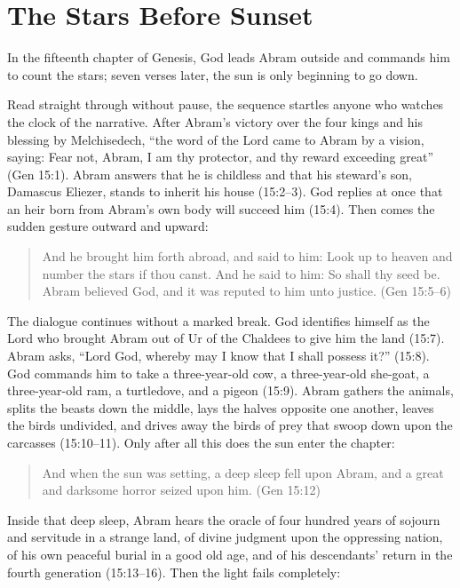 \section{The Stars Before Sunset}

In the fifteenth chapter of Genesis, God leads Abram outside and commands him to count the stars; seven verses later, the sun is only beginning to go down.

Read straight through without pause, the sequence startles anyone who watches the clock of the narrative. After Abram's victory over the four kings and his blessing by Melchisedech, ``the word of the Lord came to Abram by a vision, saying: Fear not, Abram, I am thy protector, and thy reward exceeding great'' (Gen 15:1). Abram answers that he is childless and that his steward's son, Damascus Eliezer, stands to inherit his house (15:2--3). God replies at once that an heir born from Abram's own body will succeed him (15:4). Then comes the sudden gesture outward and upward:

\begin{quote}
And he brought him forth abroad, and said to him: Look up to heaven and number the stars if thou canst. And he said to him: So shall thy seed be. Abram believed God, and it was reputed to him unto justice. (Gen 15:5--6)
\end{quote}

The dialogue continues without a marked break. God identifies himself as the Lord who brought Abram out of Ur of the Chaldees to give him the land (15:7). Abram asks, ``Lord God, whereby may I know that I shall possess it?'' (15:8). God commands him to take a three-year-old cow, a three-year-old she-goat, a three-year-old ram, a turtledove, and a pigeon (15:9). Abram gathers the animals, splits the beasts down the middle, lays the halves opposite one another, leaves the birds undivided, and drives away the birds of prey that swoop down upon the carcasses (15:10--11). Only after all this does the sun enter the chapter:

\begin{quote}
And when the sun was setting, a deep sleep fell upon Abram, and a great and darksome horror seized upon him. (Gen 15:12)
\end{quote}

Inside that deep sleep, Abram hears the oracle of four hundred years of sojourn and servitude in a strange land, of divine judgment upon the oppressing nation, of his own peaceful burial in a good old age, and of his descendants' return in the fourth generation (15:13--16). Then the light fails completely:

